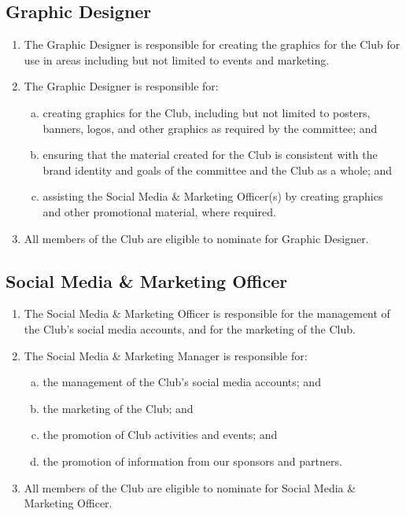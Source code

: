 \documentclass{schedule}
\begin{document}
\subsection{Graphic Designer}
\begin{enumerate}[(1)]
    \item The Graphic Designer is responsible for creating the graphics for the Club for use in areas including but not limited to events and marketing.
    \item The Graphic Designer is responsible for:
          \begin{enumerate}[(a)]
              \item creating graphics for the Club, including but not limited to posters, banners, logos, and other graphics as required by the committee; and
              \item ensuring that the material created for the Club is consistent with the brand identity and goals of the committee and the Club as a whole; and
              \item assisting the Social Media \& Marketing Officer(s) by creating graphics and other promotional material, where required.
          \end{enumerate}
    \item All members of the Club are eligible to nominate for Graphic Designer.
\end{enumerate}

\subsection{Social Media \& Marketing Officer}
\begin{enumerate}[(1)]
    \item The Social Media \& Marketing Officer is responsible for the management of the Club's social media accounts, and for the marketing of the Club.
    \item The Social Media \& Marketing Manager is responsible for:
          \begin{enumerate}[(a)]
              \item the management of the Club's social media accounts; and
              \item the marketing of the Club; and
              \item the promotion of Club activities and events; and
              \item the promotion of information from our sponsors and partners.
          \end{enumerate}
    \item All members of the Club are eligible to nominate for Social Media \& Marketing Officer.
\end{enumerate}
\end{document}

